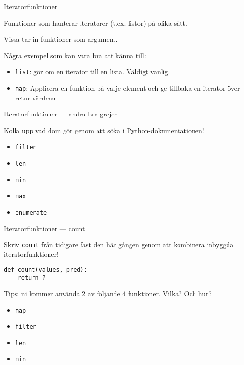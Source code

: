 \documentclass{beamer}
\begin{document}
  \begin{frame}{Iteratorfunktioner}

    Funktioner som hanterar iteratorer (t.ex. listor) på olika sätt.

    Vissa tar in funktioner som argument.

    Några exempel som kan vara bra att känna till:

    \begin{itemize}

      \item \texttt{list}: gör om en iterator till en lista. Väldigt vanlig.

      \item \texttt{map}: Applicera en funktion på varje element och ge tillbaka
      en iterator över retur-värdena.

    \end{itemize}

  \end{frame}

  \begin{frame}{Iteratorfunktioner --- andra bra grejer}

    Kolla upp vad dom gör genom att söka i Python-dokumentationen!

    \begin{itemize}
      \item \texttt{filter}
      \item \texttt{len}
      \item \texttt{min}
      \item \texttt{max}
      \item \texttt{enumerate}
    \end{itemize}

  \end{frame}

  \begin{frame}[fragile]{Iteratorfunktioner --- count}

    Skriv \texttt{count} från tidigare fast den här gången genom att kombinera
    inbyggda iteratorfunktioner!

    \begin{lstlisting}
def count(values, pred):
    return ?
    \end{lstlisting}

    \pause{}

    Tips: ni kommer använda 2 av följande 4 funktioner. Vilka? Och hur?

    \begin{itemize}
      \item \texttt{map}
      \item \texttt{filter}
      \item \texttt{len}
      \item \texttt{min}
    \end{itemize}

  \end{frame}
\end{document}
